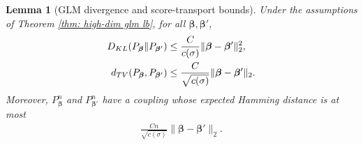 \documentclass[letterpaper,12pt]{article}
\numberwithin{equation}{section}
\theoremstyle{plain}
\numberwithin{Theorem}{section}
\numberwithin{proposition}{section}
\newtheorem{Lemma}{Lemma}
\numberwithin{Lemma}{section}
{
	\theoremstyle{definition}
	\newtheorem{Definition}{Definition}
	\newtheorem{example}{Example}
	\numberwithin{example}{section}
	\newtheorem{fact}{Fact}
	\numberwithin{fact}{section}
	\newtheorem{remark}{Remark}
}
\newcommand{\1}{\mathbbm{1}}
\def\bbeta{{\boldsymbol{\beta}}}
\begin{document}
\begin{Lemma}[GLM divergence and score-transport bounds]\label{lm: sparse glm divergence}
Under the assumptions of Theorem \ref{thm: high-dim glm lb}, for all $\bbeta,\bbeta'$,
\begin{align}
    D_{\rm KL}(P_{\bbeta}\|P_{\bbeta'})
    &\leq \frac{C}{c(\sigma)}
    \|\bbeta-\bbeta'\|_2^2,                                 \label{eq: sparse glm one sample kl}\\
    d_{\rm TV}(P_{\bbeta},P_{\bbeta'})
    &\leq \frac{C}{\sqrt{c(\sigma)}}
    \|\bbeta-\bbeta'\|_2.                                   \label{eq: sparse glm one sample tv}
\end{align}
Moreover, $P_{\bbeta}^n$ and $P_{\bbeta'}^n$ have a coupling whose expected Hamming distance is at most
\begin{align}
    \frac{Cn}{\sqrt{c(\sigma)}}\|\bbeta-\bbeta'\|_2.         \label{eq: sparse glm product coupling}
\end{align}
\end{Lemma}
\end{document}
